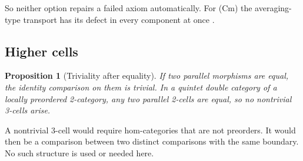 \documentclass[11pt]{article}
\newtheorem{proposition}[theorem]{Proposition}
\theoremstyle{definition}
\begin{document}
So neither option repairs a failed axiom automatically. For (Cm) the averaging-type transport has its defect in every component at
once \cite[Thm.~13.16]{Tower}.

\subsection{Higher cells}
\begin{proposition}[Triviality after equality]
If two parallel morphisms are equal, the identity comparison on them is trivial. In a quintet double category of a locally preordered
2-category, any two parallel 2-cells are equal, so no nontrivial 3-cells arise.
\end{proposition}

A nontrivial 3-cell would require hom-categories that are not preorders. It would then be a comparison between two distinct
comparisons with the same boundary. No such structure is used or needed here.

\end{document}
